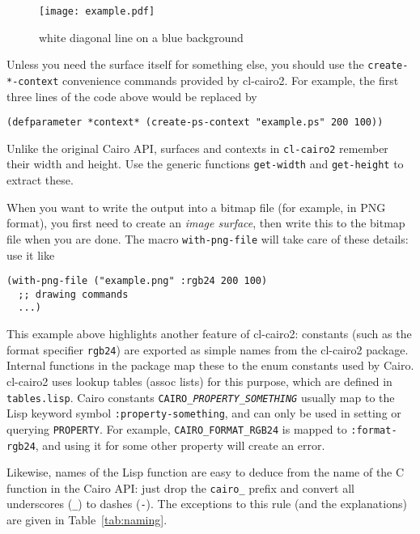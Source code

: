 \documentclass[12pt,letterpaper]{article}
\begin{document}


\begin{figure}[htbp]
  \centering
  \texttt{[image: example.pdf]}
  \caption{white diagonal line on a blue background}
  \label{fig:example}
\end{figure}

Unless you need the surface itself for something else, you should use
the \lstinline!create-*-context! convenience commands provided by
cl-cairo2.  For example, the first three lines of the code above would
be replaced by
\begin{lstlisting}
(defparameter *context* (create-ps-context "example.ps" 200 100))
\end{lstlisting}
Unlike the original Cairo API, surfaces and contexts in
\lstinline!cl-cairo2! remember their width and height.  Use the
generic functions \lstinline!get-width! and \lstinline!get-height! to
extract these.

When you want to write the output into a bitmap file (for example, in
PNG format), you first need to create an \emph{image surface}, then
write this to the bitmap file when you are done.  The macro
\lstinline!with-png-file! will take care of these details: use it like
\begin{lstlisting}
(with-png-file ("example.png" :rgb24 200 100)
  ;; drawing commands
  ...)
\end{lstlisting}

This example above highlights another feature of cl-cairo2: constants
(such as the format specifier \lstinline!rgb24!) are exported as
simple names from the cl-cairo2 package.  Internal functions in the
package map these to the enum constants used by Cairo.  cl-cairo2 uses
lookup tables (assoc lists) for this purpose, which are defined in
\verb!tables.lisp!.  Cairo constants
\texttt{CAIRO\_\textsl{PROPERTY}\_\textsl{SOMETHING}} usually map to
the Lisp keyword symbol \lstinline!:property-something!, and can only
be used in setting or querying \texttt{PROPERTY}.  For example,
\verb!CAIRO_FORMAT_RGB24!  is mapped to \lstinline!:format-rgb24!, and
using it for some other property will create an error.

Likewise, names of the Lisp function are easy to deduce from the name
of the C function in the Cairo API: just drop the \verb!cairo_! prefix
and convert all underscores (\verb!_!) to dashes (\lstinline!-!).  The
exceptions to this rule (and the explanations) are given in
Table~\ref{tab:naming}.
\end{document}
